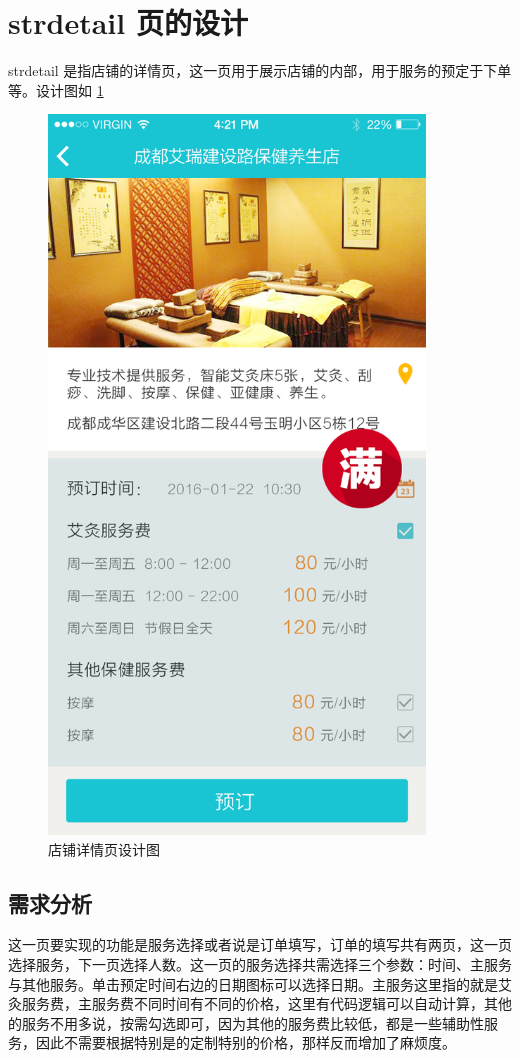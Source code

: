 \section{strdetail 页的设计}
  \label{sec:strdetail_页的设计}
    strdetail 是指店铺的详情页，这一页用于展示店铺的内部，用于服务的预定于下单等。设计图如 \ref{fig:strdetail}
    \begin{figure}[H]
      \centering
      \includegraphics[width=10cm]{./img/strdetail.png}
      \caption{店铺详情页设计图}
      \label{fig:strdetail}
    \end{figure}

    \subsection{需求分析}
      \label{subsec:需求分析}
        这一页要实现的功能是服务选择或者说是订单填写，订单的填写共有两页，这一页选择服务，下一页选择人数。这一页的服务选择共需选择三个参数：时间、主服务与其他服务。单击预定时间右边的日期图标可以选择日期。主服务这里指的就是艾灸服务费，主服务费不同时间有不同的价格，这里有代码逻辑可以自动计算，其他的服务不用多说，按需勾选即可，因为其他的服务费比较低，都是一些辅助性服务，因此不需要根据特别是的定制特别的价格，那样反而增加了麻烦度。


